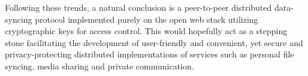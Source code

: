 Following these trends, a natural conclusion is a peer-to-peer distributed data-syncing protocol implemented purely on the open web stack utilizing cryptographic keys for access control. This would hopefully act as a stepping stone facilitating the development of user-friendly and convenient, yet secure and privacy-protecting distributed implementations of services such as personal file syncing, media sharing and private communication.
